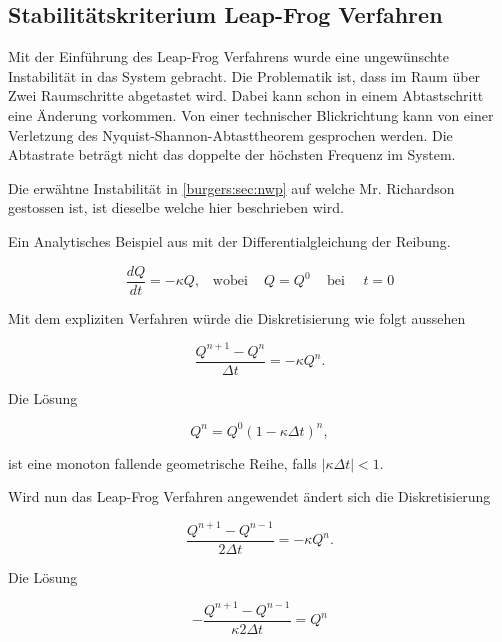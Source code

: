 \subsection{Stabilit\"atskriterium Leap-Frog Verfahren}
	Mit der Einf\"uhrung des Leap-Frog Verfahrens wurde eine ungew\"unschte Instabilit\"at in das System gebracht.
	Die Problematik ist, dass im Raum über Zwei Raumschritte abgetastet wird.
	Dabei kann schon in einem Abtastschritt eine Änderung vorkommen.
	Von einer technischer Blickrichtung kann von einer Verletzung des Nyquist-Shannon-Abtasttheorem gesprochen werden.
	Die Abtastrate beträgt nicht das doppelte der höchsten Frequenz im System.
	
	\medskip
	
	Die erw\"ahtne Instabilit\"at in \ref{burgers:sec:nwp} auf welche Mr. Richardson gestossen ist, ist dieselbe welche hier beschrieben wird.
	
	Ein Analytisches Beispiel aus \cite{burgers:lynch_2014} mit der Differentialgleichung der Reibung.
	
	\begin{equation}
		\frac{dQ}{dt} = - \kappa Q, \,\,\,\,\, \text{wobei} \, \,\,\,\,\,\, Q=Q^0 \,\,\,\,\,\,\, \text{bei} \,\,\,\,\,\,\,\, t=0
	\end{equation}

	Mit dem expliziten Verfahren w\"urde die Diskretisierung wie folgt aussehen
	
	\begin{equation}
		\frac{Q^{n+1}-Q^n}{\Delta t} = - \kappa Q^n.
	\end{equation}

	Die L\"osung
	
		\begin{equation}
			Q^n = Q^0(1-\kappa \Delta t)^n,
		\end{equation}
		
	ist eine monoton fallende geometrische Reihe, falls $|\kappa \Delta t| <1$.
	
	\medskip
	
	Wird nun das Leap-Frog Verfahren angewendet \"andert sich die Diskretisierung
	
	\begin{equation}
		\frac{Q^{n+1}-Q^{n-1}}{2 \Delta t} = - \kappa Q^n.
	\end{equation}

	Die L\"osung 
	
	\begin{equation}
		-\frac{Q^{n+1}-Q^{n-1}}{\kappa 2 \Delta t} = Q^n
	\end{equation}


